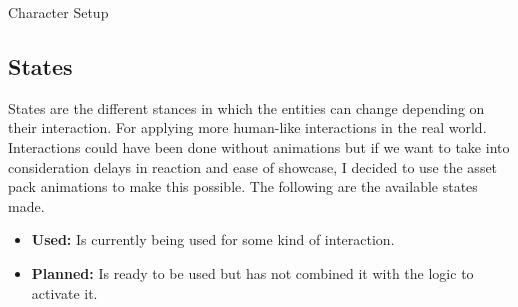 \documentclass[10pt, letterpaper]{article}
\begin{document}
\begin{Form}
\begin{center}
		Character Setup
	\end{center}

	\subsection{States}

	States are the different stances in which the entities can change depending on their interaction. For applying more
	human-like interactions in the real world. Interactions could have been done without animations but if we want to
	take into consideration delays in reaction and ease of showcase, I decided to use the asset pack animations to make
	this possible. The following are the available states made.

	\begin{itemize}
		\item \textbf{Used:} Is currently being used for some kind of interaction.
		\item \textbf{Planned:} Is ready to be used but has not combined it with the logic to activate it.
	\end{itemize}


\end{Form}
\end{document}
